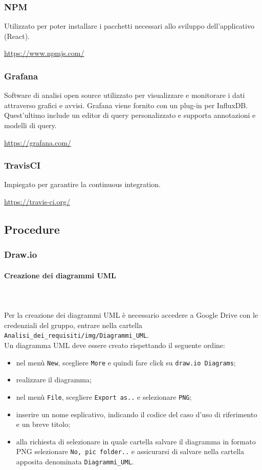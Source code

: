 	\subsubsection{NPM}
	Utilizzato per poter installare i pacchetti necessari allo sviluppo dell’applicativo (React\glo).
	\\
	\centerline{\url{https://www.npmjs.com/}}
	\subsubsection{Grafana}	
	Software di analisi open source utilizzato per visualizzare e monitorare i dati attraverso grafici e avvisi. Grafana viene fornito con un plug-in per InfluxDB. Quest'ultimo include un editor di query personalizzato e supporta annotazioni e modelli di query.\\
	\centerline{\url{https://grafana.com/}}
	\subsubsection{TravisCI}
	Impiegato per garantire la continuous integration.
	\\
	\centerline{\url{https://travis-ci.org/}}
	\subsection{Procedure}
	\subsubsection{Draw.io}
	\paragraph*{Creazione dei diagrammi UML} \mbox{} \\ \mbox{} \\
	Per la creazione dei diagrammi UML è necessario accedere a Google Drive con le credenziali del gruppo, entrare nella cartella \texttt{Analisi\_dei\_requisiti/img/Diagrammi\_UML}. \\ Un diagramma UML deve essere creato rispettando il seguente ordine: \begin{itemize}
\item nel menù \texttt{New}, scegliere \texttt{More} e quindi fare click su \texttt{draw.io Diagrams};
\item realizzare il diagramma;
\item nel menù \texttt{File}, scegliere \texttt{Export as..} e selezionare \texttt{PNG};
\item inserire un nome esplicativo, indicando il codice del caso d'uso di riferimento e un breve titolo;
\item alla richiesta di selezionare in quale cartella salvare il diagramma in formato PNG selezionare \texttt{No, pic folder..} e assicurarsi di salvare nella cartella apposita denominata \texttt{Diagrammi\_UML}.
\end{itemize}

